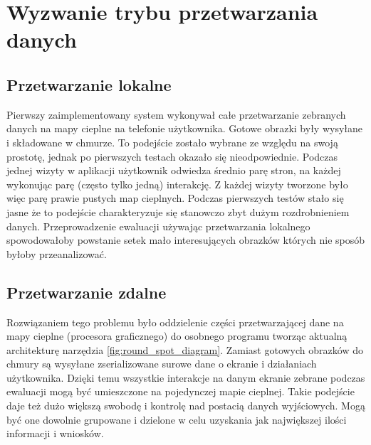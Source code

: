 \bigskip
{}

\section{Wyzwanie trybu przetwarzania danych}

\subsection{Przetwarzanie lokalne}
Pierwszy zaimplementowany system wykonywał całe przetwarzanie zebranych danych na mapy cieplne na telefonie użytkownika. Gotowe obrazki były wysyłane i składowane w chmurze. To podejście zostało wybrane ze względu na swoją prostotę, jednak po pierwszych testach okazało się nieodpowiednie. Podczas jednej wizyty w aplikacji  użytkownik odwiedza średnio parę stron, na każdej wykonując parę (często tylko jedną) interakcję. Z każdej wizyty tworzone było więc parę prawie pustych map cieplnych. Podczas pierwszych testów stało się jasne że to podejście charakteryzuje się stanowczo zbyt dużym rozdrobnieniem danych. Przeprowadzenie ewaluacji używając przetwarzania lokalnego spowodowałoby powstanie setek mało interesujących obrazków których nie sposób byłoby przeanalizować.

\subsection{Przetwarzanie zdalne}
Rozwiązaniem tego problemu było oddzielenie części przetwarzającej dane na mapy cieplne (procesora graficznego) do osobnego programu tworząc aktualną architekturę narzędzia \ref{fig:round_spot_diagram}. Zamiast gotowych obrazków do chmury są wysyłane zserializowane surowe dane o ekranie i działaniach użytkownika. Dzięki temu wszystkie interakcje na danym ekranie zebrane podczas ewaluacji mogą być umieszczone na pojedynczej mapie cieplnej. Takie podejście daje też dużo większą swobodę i kontrolę nad postacią danych wyjściowych. Mogą być one dowolnie grupowane i dzielone w celu uzyskania jak największej ilości informacji i wniosków.
